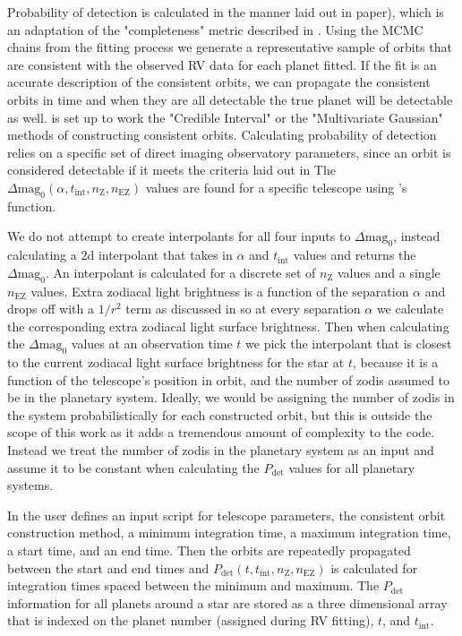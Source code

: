 Probability of detection is calculated in the manner laid out in
 paper), which is an adaptation of the "completeness"
metric described in \citep{brownSingleVisitPhotometric2005} . Using the MCMC
chains from the fitting process we generate a representative sample of orbits
that are consistent with the observed RV data for each planet fitted. If the
fit is an accurate description of the consistent orbits, we can propagate the
consistent orbits in time and when they are all detectable the true planet will
be detectable as well.  is set up to work the "Credible Interval" or
the "Multivariate Gaussian" methods of constructing consistent orbits.
Calculating probability of detection relies on a specific set of direct imaging
observatory parameters, since an orbit is considered detectable if it meets the
criteria laid out in  The $\Delta\textrm{mag}_0(\alpha,
t_{\textrm{int}}, n_\textrm{Z}, n_\textrm{EZ})$ values are found for a specific
telescope using 's  function. 

We do not attempt to create interpolants for all four inputs to
$\Delta\textrm{mag}_0$, instead calculating a 2d interpolant that takes in
$\alpha$ and $t_\textrm{int}$ values and returns the $\Delta\textrm{mag}_0$. An
interpolant is calculated for a discrete set of $n_\textrm{Z}$ values and a
single $n_\textrm{EZ}$ values. Extra zodiacal light brightness is a function of
the separation $\alpha$ and drops off with a $1/r^2$ term as discussed in
\citet{starkMaximizingExoEarthCandidate2014} so at every separation $\alpha$ we
calculate the corresponding extra zodiacal light surface brightness. Then when
calculating the $\Delta\textrm{mag}_0$ values at an observation time $t$ we
pick the interpolant that is closest to the current zodiacal light surface
brightness for the star at $t$, because it is a function of the telescope's
position in orbit, and the number of zodis assumed to be in the planetary
system. Ideally, we would be assigning the number of zodis in the system
probabilistically for each constructed orbit, but this is outside the scope of
this work as it adds a tremendous amount of complexity to the code. Instead we
treat the number of zodis in the planetary system as an input and assume it to
be constant when calculating the $P_\textrm{det}$ values for all planetary
systems.

In  the user defines an  input script for telescope
parameters, the consistent orbit construction method, a minimum integration
time, a maximum integration time, a start time, and an end time. Then the
orbits are repeatedly propagated between the start and end times and
$P_{\textrm{det}}(t, t_{\textrm{int}}, n_\textrm{Z}, n_\textrm{EZ})$ is
calculated for integration times spaced between the minimum and maximum. The
$P_{\textrm{det}}$ information for all planets around a star are stored as a
three dimensional array that is indexed on the planet number (assigned during
RV fitting), $t$, and $t_{\textrm{int}}$.

